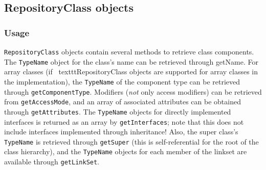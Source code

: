 \documentclass{report}
\begin{document}
\subsection{RepositoryClass objects}\label{repclass_usage}


\subsubsection{Usage}

\texttt{RepositoryClass} objects contain several methods to retrieve
class components. The \texttt{TypeName} object for the class's name can
be retrieved through {getName}. For array classes (if \
texttt{Re\-pos\-i\-tory\-Class} objects are supported for array classes in 
the implementation), the \texttt{TypeName} of the component type can be 
retrieved through \texttt{getComponentType}. Modifiers ({\em not} only access
modifiers) can be retrieved from \texttt{getAccessMode}, and an array of 
associated attributes can be obtained through \texttt{getAttributes}. The 
\texttt{TypeName} objects for directly implemented interfaces is returned as 
an array by \texttt{getInterfaces}; note that this does not include interfaces
implemented through inheritance! Also, the super class's \texttt{TypeName}
is retrieved through \texttt{getSuper} (this is self-referential for the
root of the class hierarchy), and the \texttt{TypeName} objects for each
member of the linkset are available through \texttt{getLinkSet}.
\end{document}
